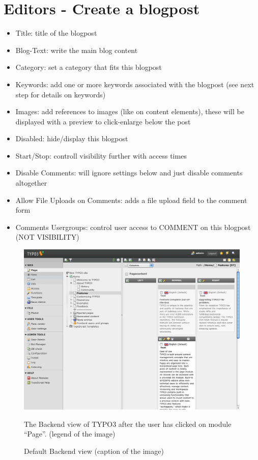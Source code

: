 \documentclass[a4paper,10pt,english]{sphinxmanual}
\begin{document}
\section{Editors - Create a blogpost}
\label{UsersManual/Index:editors-create-a-blogpost}\begin{itemize}
\item {} 
Title: title of the blogpost

\item {} 
Blog-Text: write the main blog content

\item {} 
Category: set a category that fits this blogpost

\item {} 
Keywords: add one or more keywords associated with the blogpost (see next step for details on keywords)

\item {} 
Images: add references to images (like on content elements), these will be displayed with a preview to click-enlarge below the post

\item {} 
Disabled: hide/display this blogpost

\item {} 
Start/Stop: controll visibility further with access times

\item {} 
Disable Comments: will ignore settings below and just disable comments altogether

\item {} 
Allow File Uploads on Comments: adds a file upload field to the comment form

\item {} 
Comments Usergroups: control user access to COMMENT on this blogpost (NOT VISIBILITY)

\end{itemize}
\begin{figure}[htbp]
\centering
\capstart

\includegraphics{BackendView.png}
\caption{Default Backend view (caption of the image)}{\small 
The Backend view of TYPO3 after the user has clicked on module ``Page''. (legend of the image)
}\end{figure}
\end{document}
